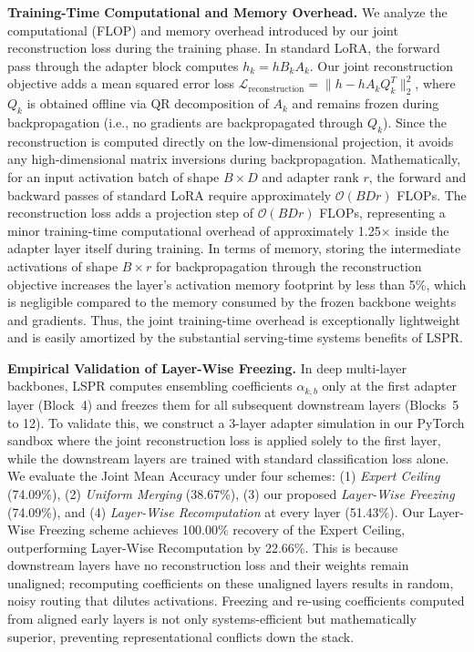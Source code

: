 \textbf{Training-Time Computational and Memory Overhead.} We analyze the computational (FLOP) and memory overhead introduced by our joint reconstruction loss during the training phase. In standard LoRA, the forward pass through the adapter block computes $h_k = h B_k A_k$. Our joint reconstruction objective adds a mean squared error loss $\mathcal{L}_{\text{reconstruction}} = \| h - h A_k Q_k^T \|_2^2$, where $Q_k$ is obtained offline via QR decomposition of $A_k$ and remains frozen during backpropagation (i.e., no gradients are backpropagated through $Q_k$). Since the reconstruction is computed directly on the low-dimensional projection, it avoids any high-dimensional matrix inversions during backpropagation. Mathematically, for an input activation batch of shape $B \times D$ and adapter rank $r$, the forward and backward passes of standard LoRA require approximately $\mathcal{O}(B D r)$ FLOPs. The reconstruction loss adds a projection step of $\mathcal{O}(B D r)$ FLOPs, representing a minor training-time computational overhead of approximately 1.25$\times$ inside the adapter layer itself during training. In terms of memory, storing the intermediate activations of shape $B \times r$ for backpropagation through the reconstruction objective increases the layer's activation memory footprint by less than 5\%, which is negligible compared to the memory consumed by the frozen backbone weights and gradients. Thus, the joint training-time overhead is exceptionally lightweight and is easily amortized by the substantial serving-time systems benefits of LSPR.

\textbf{Empirical Validation of Layer-Wise Freezing.} In deep multi-layer backbones, LSPR computes ensembling coefficients $\alpha_{k, b}$ only at the first adapter layer (Block~4) and freezes them for all subsequent downstream layers (Blocks~5 to 12). To validate this, we construct a 3-layer adapter simulation in our PyTorch sandbox where the joint reconstruction loss is applied solely to the first layer, while the downstream layers are trained with standard classification loss alone. We evaluate the Joint Mean Accuracy under four schemes: (1) \textit{Expert Ceiling} (74.09\%), (2) \textit{Uniform Merging} (38.67\%), (3) our proposed \textit{Layer-Wise Freezing} (74.09\%), and (4) \textit{Layer-Wise Recomputation} at every layer (51.43\%). Our Layer-Wise Freezing scheme achieves 100.00\% recovery of the Expert Ceiling, outperforming Layer-Wise Recomputation by 22.66\%. This is because downstream layers have no reconstruction loss and their weights remain unaligned; recomputing coefficients on these unaligned layers results in random, noisy routing that dilutes activations. Freezing and re-using coefficients computed from aligned early layers is not only systems-efficient but mathematically superior, preventing representational conflicts down the stack.
